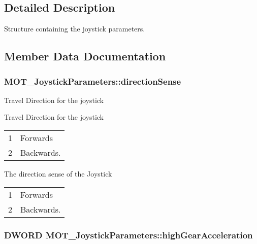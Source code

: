 \subsection{Detailed Description}
Structure containing the joystick parameters. 



\subsection{Member Data Documentation}
\subsubsection[{\texorpdfstring{direction\+Sense}{directionSense}}]{ M\+O\+T\+\_\+\+Joystick\+Parameters\+::direction\+Sense}\hypertarget{struct_m_o_t___joystick_parameters_a25f504f34b7678e0cb381a9371103c3e}{}\label{struct_m_o_t___joystick_parameters_a25f504f34b7678e0cb381a9371103c3e}


Travel Direction for the joystick 

Travel Direction for the joystick \tabulinesep=1mm
\begin{longtabu} spread 0pt [c]{*2{|X[-1]}|}
&Forwards \\
2&Backwards. \\
\end{longtabu}


The direction sense of the Joystick \tabulinesep=1mm
\begin{longtabu} spread 0pt [c]{*2{|X[-1]}|}
&Forwards \\
2&Backwards. \\
\end{longtabu}
\subsubsection[{\texorpdfstring{high\+Gear\+Acceleration}{highGearAcceleration}}]{\setlength{\rightskip}{0pt plus 5cm}D\+W\+O\+RD M\+O\+T\+\_\+\+Joystick\+Parameters\+::high\+Gear\+Acceleration}\hypertarget{struct_m_o_t___joystick_parameters_a002634fed9cb3c390056f34822c15910}{}\label{struct_m_o_t___joystick_parameters_a002634fed9cb3c390056f34822c15910}


